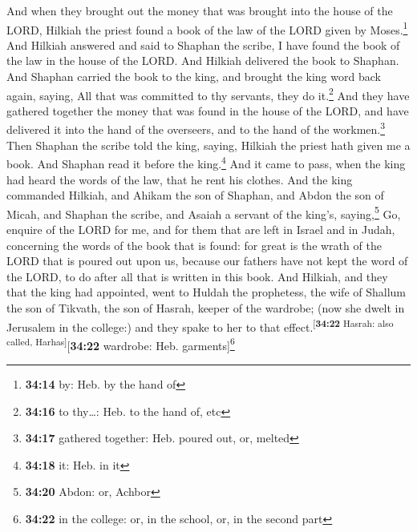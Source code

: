  And when they brought out the money that was brought
into the house of the LORD, Hilkiah the priest found a book of the law
of the LORD given by Moses.\footnote{\textbf{34:14} by: Heb. by the hand
  of}  And Hilkiah answered and said to Shaphan the
scribe, I have found the book of the law in the house of the LORD. And
Hilkiah delivered the book to Shaphan.  And Shaphan
carried the book to the king, and brought the king word back again,
saying, All that was committed to thy servants, they do it.\footnote{\textbf{34:16}
  to thy\ldots: Heb. to the hand of, etc}  And they have
gathered together the money that was found in the house of the LORD, and
have delivered it into the hand of the overseers, and to the hand of the
workmen.\footnote{\textbf{34:17} gathered together: Heb. poured out, or,
  melted}  Then Shaphan the scribe told the king, saying,
Hilkiah the priest hath given me a book. And Shaphan read it before the
king.\footnote{\textbf{34:18} it: Heb. in it}  And it
came to pass, when the king had heard the words of the law, that he rent
his clothes.  And the king commanded Hilkiah, and Ahikam
the son of Shaphan, and Abdon the son of Micah, and Shaphan the scribe,
and Asaiah a servant of the king's, saying,\footnote{\textbf{34:20}
  Abdon: or, Achbor}  Go, enquire of the LORD for me, and
for them that are left in Israel and in Judah, concerning the words of
the book that is found: for great is the wrath of the LORD that is
poured out upon us, because our fathers have not kept the word of the
LORD, to do after all that is written in this book.  And
Hilkiah, and they that the king had appointed, went to Huldah the
prophetess, the wife of Shallum the son of Tikvath, the son of Hasrah,
keeper of the wardrobe; (now she dwelt in Jerusalem in the college:) and
they spake to her to that effect.\textsuperscript{{[}\textbf{34:22}
Hasrah: also called, Harhas{]}}{[}\textbf{34:22} wardrobe: Heb.
garments{]}\footnote{\textbf{34:22} in the college: or, in the school,
  or, in the second part}

